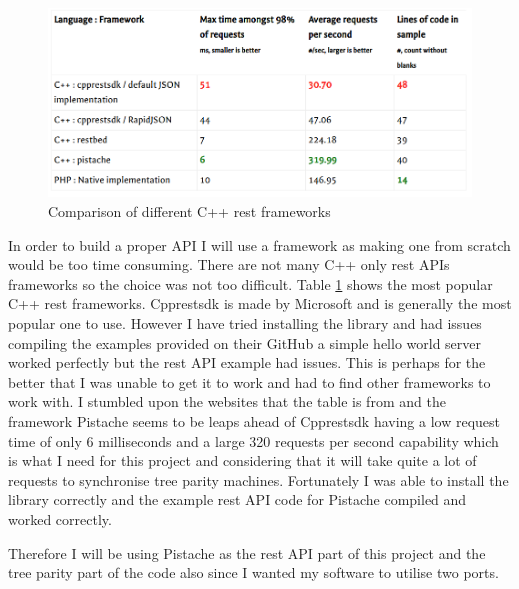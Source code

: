 \begin{figure}[!h]
  \centering
      \includegraphics[width=1\textwidth]{Figures/cppframeworks.png}
  \caption[Comparison of different C++ rest frameworks]{Comparison of different C++ rest frameworks\cite{Crestframeworks}}
  \label{fig:Crestframeworks}
\end{figure}

\FloatBarrier

In order to build a proper API I will use a framework as making one from scratch would be too time consuming. There are not many C++ only rest APIs frameworks so the choice was not too difficult. 
Table \ref{fig:Crestframeworks} shows the most popular C++ rest frameworks. Cpprestsdk is made by Microsoft and is generally the most popular one to use. However I have tried installing the library and had issues compiling the examples provided on their GitHub a simple hello world server worked perfectly but the rest API example had issues. This is perhaps for the better that I was unable to get it to work and had to find other frameworks to work with. I stumbled upon the websites that the table is from and the framework Pistache \cite{pistache} seems to be leaps ahead of Cpprestsdk having a low request time of only 6 milliseconds and a large 320 requests per second capability which is what I need for this project and considering that it will take quite a lot of requests to synchronise tree parity machines. Fortunately I was able to install the library correctly and the example rest API code for Pistache compiled and worked correctly.

Therefore I will be using Pistache as the rest API part of this project and the tree parity part of the code also since I wanted my software to utilise two ports.



